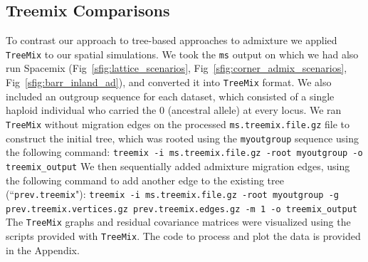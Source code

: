 \documentclass[10pt,letterpaper]{article}
\begin{document}
\subsection*{Treemix Comparisons}
To contrast our approach to tree-based approaches to admixture we
applied \texttt{TreeMix} \cite{Treemix} to our spatial simulations.
%
We took the \texttt{ms} output on which we had also run Spacemix 
(Fig\ \ref{sfig:lattice_scenarios}, Fig\ \ref{sfig:corner_admix_scenarios}, Fig\ \ref{sfig:barr_inland_ad}), 
and converted it into \texttt{TreeMix} format.  
We also included an outgroup sequence for each dataset,
 which consisted of a single haploid individual who carried the $0$ (ancestral allele) at every locus. 
 We ran \texttt{TreeMix} without migration edges on the processed \texttt{ms.treemix.file.gz} file to construct the initial
tree, which was rooted using the \texttt{myoutgroup} sequence using the following command:
\hspace*{\fill}\newline\hspace*{\fill}\newline
\texttt{treemix -i ms.treemix.file.gz  -root myoutgroup -o treemix\_output}
\hspace*{\fill}\newline\hspace*{\fill}\newline
We then sequentially added admixture migration edges, 
using the following command to add another edge to the existing tree (``\texttt{prev.treemix}"):
\hspace*{\fill}\newline\hspace*{\fill}\newline
\texttt{treemix -i  ms.treemix.file.gz -root myoutgroup  -g  prev.treemix.vertices.gz  prev.treemix.edges.gz -m 1 -o  treemix\_output}
\hspace*{\fill}\newline\hspace*{\fill}\newline
The \texttt{TreeMix} graphs and residual covariance matrices were visualized
using the scripts provided with \texttt{TreeMix}. 
The code to process and plot the data is provided in the Appendix.\\
\end{document}
